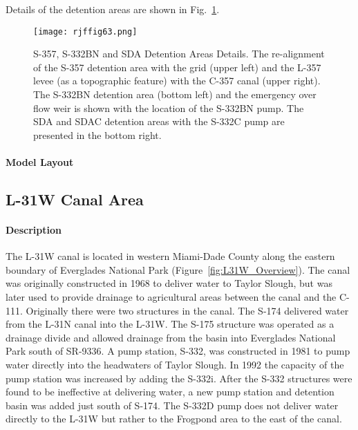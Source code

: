 Details of the detention areas are shown in Fig.~\ref{fig:rjffig63}.

\begin{figure}[!h]
  \begin{center}
  \texttt{[image: rjffig63.png]}
  \caption[S-357, S-332BN and SDA Detention Areas Details.]{S-357, S-332BN and SDA Detention Areas Details. The re-alignment of the S-357 detention area with the grid (upper left) and the L-357 levee (as a topographic feature) with the C-357 canal (upper right). The S-332BN detention area (bottom left) and the emergency over  flow weir is shown with the location of the S-332BN pump. The SDA and SDAC detention areas with the S-332C pump are presented in the bottom right.}
  \label{fig:rjffig63}
  \end{center}
\end{figure}


\paragraph{Model Layout}




\clearpage
\subsection{L-31W Canal Area}

\paragraph{Description}
The L-31W canal is located in western Miami-Dade County along the eastern boundary of Everglades National Park (Figure~\ref{fig:L31W_Overview}).  The canal was originally constructed in 1968 to deliver water to Taylor Slough, but was later used to provide drainage to agricultural areas between the canal and the C-111.  Originally there were two structures in the canal. The S-174 delivered water from the L-31N canal into the L-31W.  The S-175 structure was operated as a drainage divide and allowed drainage from the basin into Everglades National Park south of SR-9336.  A pump station, S-332, was constructed in 1981 to pump water directly into the headwaters of Taylor Slough.  In 1992 the capacity of the pump station was increased by adding the S-332i.  After the S-332 structures were found to be ineffective at delivering water, a new pump station and detention basin was added just south of S-174.  The S-332D pump does not deliver water directly to the L-31W but rather to the Frogpond area to the east of the canal.

